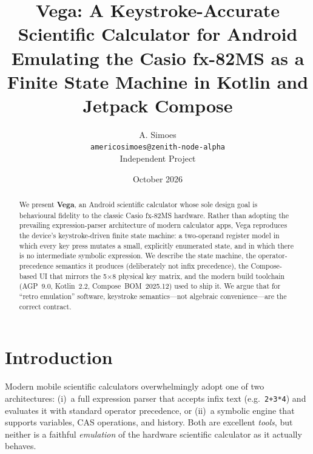 \documentclass[11pt,a4paper]{article}
\title{\textbf{Vega: A Keystroke-Accurate Scientific Calculator for Android}\\[4pt]
\large Emulating the Casio fx-82MS as a Finite State Machine in Kotlin and Jetpack Compose}
\author{A. Simoes\\
\small \texttt{americosimoes@zenith-node-alpha}\\[2pt]
\small Independent Project}
\date{October 2026}
\begin{document}
\maketitle

\begin{abstract}
\noindent
We present \textbf{Vega}, an Android scientific calculator whose sole design goal is behavioural fidelity to the classic Casio fx-82MS hardware. Rather than adopting the prevailing expression-parser architecture of modern calculator apps, Vega reproduces the device's keystroke-driven finite state machine: a two-operand register model in which every key press mutates a small, explicitly enumerated state, and in which there is no intermediate symbolic expression. We describe the state machine, the operator-precedence semantics it produces (deliberately not infix precedence), the Compose-based UI that mirrors the 5$\times$8 physical key matrix, and the modern build toolchain (AGP~9.0, Kotlin~2.2, Compose~BOM~2025.12) used to ship it. We argue that for ``retro emulation'' software, keystroke semantics---not algebraic convenience---are the correct contract.
\end{abstract}

\tableofcontents
\vspace{1em}

\section{Introduction}

Modern mobile scientific calculators overwhelmingly adopt one of two architectures: (i)~a full expression parser that accepts infix text (e.g.\ \texttt{2+3*4}) and evaluates it with standard operator precedence, or (ii)~a symbolic engine that supports variables, CAS operations, and history. Both are excellent \emph{tools}, but neither is a faithful \emph{emulation} of the hardware scientific calculator as it actually behaves.
\end{document}
